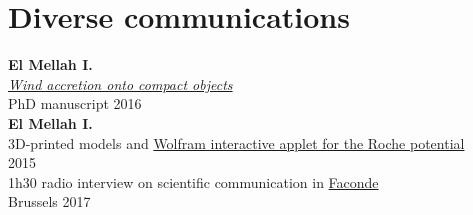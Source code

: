 %
%
%
%

\section*{Diverse communications}

\begin{flushleft}

\textbf{El Mellah I.}\\ 
\href{http://adsabs.harvard.edu/abs/2017arXiv170709165E}{\emph{Wind accretion onto compact objects}}\\
PhD manuscript 2016\\
\vspace*{0.3cm}
\textbf{El Mellah I.}\\ 
3D-printed models and \href{http://demonstrations.wolfram.com/TrajectoryOfATestMassInARochePotential/}{Wolfram interactive applet for the Roche potential}\\
2015\\
\vspace*{0.3cm}
1h30 radio interview on scientific communication in \href{https://www.mixcloud.com/faconde/faconde-s2e01-vulgarisation/}{Faconde}\\ 
Brussels 2017\\

\end{flushleft}


